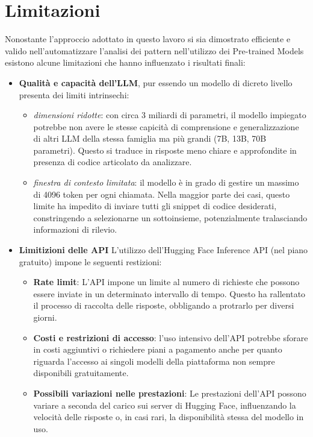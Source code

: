 \documentclass{article}
\begin{document}
\section{Limitazioni}
Nonostante l'approccio adottato in questo lavoro si sia dimostrato efficiente e valido nell'automatizzare l'analisi dei pattern nell'utilizzo dei Pre-trained Models esistono alcune limitazioni che hanno influenzato i risultati finali:
\begin{itemize}
    \item \textbf{Qualità e capacità dell'LLM}, pur essendo un modello di dicreto livello presenta dei limiti intrinsechi:
    \begin{itemize}
        \item \textit{dimensioni ridotte}: con circa 3 miliardi di parametri, il modello impiegato potrebbe non avere le stesse capicità di comprensione e generalizzazione di altri LLM della stessa famiglia ma più grandi (7B, 13B, 70B parametri). Questo si traduce in risposte meno chiare e approfondite in presenza di codice articolato da analizzare.
        \item \textit{finestra di contesto limitata}: il modello è in grado di gestire un massimo di 4096 token per ogni chiamata. Nella maggior parte dei casi, questo limite ha impedito di inviare tutti gli snippet di codice desiderati, constringendo a selezionarne un sottoinsieme, potenzialmente tralasciando informazioni di rilevio.
    \end{itemize}

    \item \textbf{Limitizioni delle API}
    L'utilizzo dell’Hugging Face Inference API (nel piano gratuito) impone le seguenti restizioni:
    \begin{itemize}
        \item \textbf{Rate limit}: L’API impone un limite al numero di richieste che possono essere inviate in un determinato intervallo di tempo. Questo ha rallentato il processo di raccolta delle risposte, obbligando a protrarlo per diversi giorni. 
        \item \textbf{Costi e restrizioni di accesso}: l'uso intensivo dell'API potrebbe sforare in costi aggiuntivi o richiedere piani a pagamento anche per quanto riguarda l'accesso ai singoli modelli della piattaforma non sempre disponibili gratuitamente.
        \item \textbf{Possibili variazioni nelle prestazioni}: Le prestazioni dell’API possono variare a seconda del carico sui server di Hugging Face, influenzando la velocità delle risposte o, in casi rari, la disponibilità stessa del modello in uso.
    \end{itemize}
\end{itemize}
\end{document}
